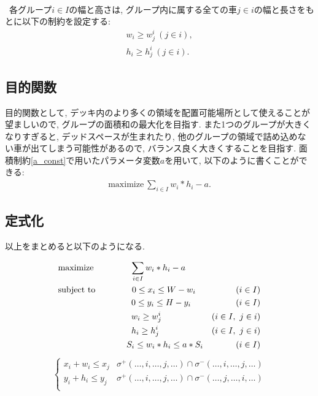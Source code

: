 \\
\ 各グループ$i \in I$の幅と高さは, グループ内に属する全ての車$j \in i$の幅と長さをもとに以下の制約を設定する: \\
\begin{eqnarray}
    w_i \geq w^i_j \ (j \in i), \\
    h_i \geq h^i_j \ (j \in i). 
\end{eqnarray}


\subsection{目的関数}
目的関数として, デッキ内のより多くの領域を配置可能場所として使えることが望ましいので, グループの面積和の最大化を目指す. 
また1つのグループが大きくなりすぎると, デッドスペースが生まれたり, 他のグループの領域で詰め込めない車が出てしまう可能性があるので, バランス良く大きくすることを目指す. 
面積制約\ref{a_const}で用いたパラメータ変数$a$を用いて, 以下のように書くことができる: \\
\begin{eqnarray}
    \mathrm{maximize}\ \sum_{i \in I} w_i*h_i  - a. 
\end{eqnarray}

\subsection{定式化}
以上をまとめると以下のようになる. \\
\begin{center}
    \begin{align}
        & \textrm{maximize} \hspace{1.5cm}
        \sum_{i \in I} w_i*h_i - a \\
        & \textrm{subject\ to} \hspace{1.5cm}
        0 \leq x_i \leq W - w_i & (i \in I) \\
        &\hspace{3cm} 0 \leq y_i \leq H - y_i & (i \in I) \\
        &\hspace{3cm} w_i \geq w^i_j & (i \in I,\ j \in i) \\
        &\hspace{3cm} h_i \geq h^i_j & (i \in I,\ j \in i) \\
        &\hspace{2.8cm} S_i \leq w_i*h_i \leq a*S_i &(i \in I)
    \end{align}
    \begin{eqnarray}
        \hspace{2cm} \left\{
            \begin{array}{ll}
                x_i + w_i \leq x_j & \sigma^+(\ldots,i,\ldots,j,\ldots) \cap \sigma^-(\ldots,i,\ldots,j,\ldots) \\
                y_i + h_i \leq y_j & \sigma^+(\ldots,i,\ldots,j,\ldots) \cap \sigma^-(\ldots,j,\ldots,i,\ldots) \\
            \end{array}
        \hspace{2cm} \right.
    \end{eqnarray}
\end{center}

